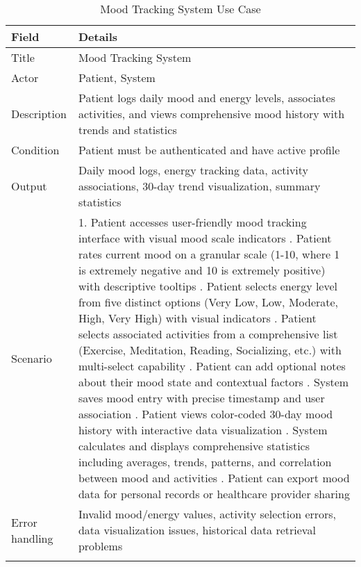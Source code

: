 \begin{longtable}{|p{3cm}|p{12cm}|}
\hline
\textbf{Field} & \textbf{Details} \\
\hline
Title & Mood Tracking System \\
\hline
Actor & Patient, System \\
\hline
Description & Patient logs daily mood and energy levels, associates activities, and views comprehensive mood history with trends and statistics \\
\hline
Condition & Patient must be authenticated and have active profile \\
\hline
Output & Daily mood logs, energy tracking data, activity associations, 30-day trend visualization, summary statistics \\
\hline
Scenario & 1. Patient accesses user-friendly mood tracking interface with visual mood scale indicators \newline 2. Patient rates current mood on a granular scale (1-10, where 1 is extremely negative and 10 is extremely positive) with descriptive tooltips \newline 3. Patient selects energy level from five distinct options (Very Low, Low, Moderate, High, Very High) with visual indicators \newline 4. Patient selects associated activities from a comprehensive list (Exercise, Meditation, Reading, Socializing, etc.) with multi-select capability \newline 5. Patient can add optional notes about their mood state and contextual factors \newline 6. System saves mood entry with precise timestamp and user association \newline 7. Patient views color-coded 30-day mood history with interactive data visualization \newline 8. System calculates and displays comprehensive statistics including averages, trends, patterns, and correlation between mood and activities \newline 9. Patient can export mood data for personal records or healthcare provider sharing \\
\hline
Error handling & Invalid mood/energy values, activity selection errors, data visualization issues, historical data retrieval problems \\
\hline
\caption{Mood Tracking System Use Case}
\end{longtable}

